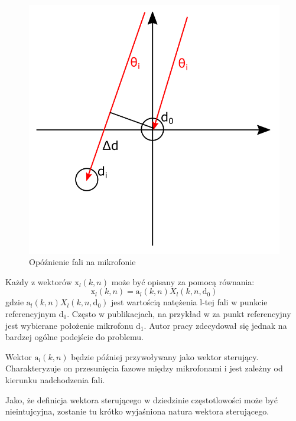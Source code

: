 \begin{figure}[h]
    \centering
    \includegraphics[width=\textwidth]{Images/direction.png}
    \caption{Opóźnienie fali na mikrofonie}
    \label{fig:direction}
\end{figure}
\noindent Każdy z wektorów $\bm{\mathrm{x}}_l(k,n)$ może być opisany za pomocą równania:
\begin{equation}
    \label{equation:2.3}
    \bm{\mathrm{x}}_l(k,n)=
    \bm{\mathrm{a}}_l(k,n)X_{l}(k,n,\bm{\mathrm{d}}_{0})
\end{equation}
\noindent gdzie $\bm{\mathrm{a}}_l(k,n)X_{l}(k,n,\bm{\mathrm{d}}_{0})$ jest wartością natężenia l-tej fali w punkcie referencyjnym $\bm{\mathrm{d}}_0$. Często w publikacjach, na przykład w \cite{Braun2014} za punkt referencyjny jest wybierane położenie mikrofonu $\bm{\mathrm{d}}_1$. Autor pracy zdecydował się jednak na bardzej ogólne podejście do problemu.

\noindent Wektor $\bm{\mathrm{a}}_l(k,n)$ będzie później przywoływany jako wektor sterujący. Charakteryzuje on przesunięcia fazowe między mikrofonami i jest zależny od kierunku nadchodzenia fali.


\noindent Jako, że definicja wektora sterującego w dziedzinie częstotlowości może być nieintujcyjna, zostanie tu krótko wyjaśniona natura wektora sterującego.

